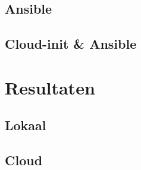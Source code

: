 \subsection{Ansible}

\subsection{Cloud-init \& Ansible}

\section{Resultaten}

\subsection{Lokaal}

\subsection{Cloud}
